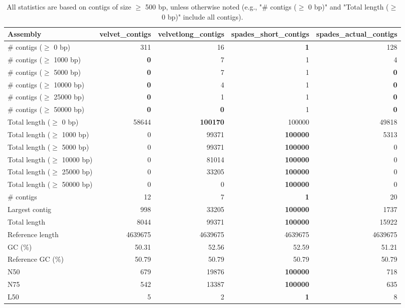 \documentclass[12pt,a4paper]{article}
\begin{document}
\begin{table}[ht]
\begin{center}
\caption{All statistics are based on contigs of size $\geq$ 500 bp, unless otherwise noted (e.g., "\# contigs ($\geq$ 0 bp)" and "Total length ($\geq$ 0 bp)" include all contigs).}
\begin{tabular}{|l*{4}{|r}|}
\hline
Assembly & velvet\_contigs & velvetlong\_contigs & spades\_short\_contigs & spades\_actual\_contigs \\ \hline
\# contigs ($\geq$ 0 bp) & 311 & 16 & {\bf 1} & 128 \\ \hline
\# contigs ($\geq$ 1000 bp) & {\bf 0} & 7 & 1 & 4 \\ \hline
\# contigs ($\geq$ 5000 bp) & {\bf 0} & 7 & 1 & {\bf 0} \\ \hline
\# contigs ($\geq$ 10000 bp) & {\bf 0} & 4 & 1 & {\bf 0} \\ \hline
\# contigs ($\geq$ 25000 bp) & {\bf 0} & 1 & 1 & {\bf 0} \\ \hline
\# contigs ($\geq$ 50000 bp) & {\bf 0} & {\bf 0} & 1 & {\bf 0} \\ \hline
Total length ($\geq$ 0 bp) & 58644 & {\bf 100170} & 100000 & 49818 \\ \hline
Total length ($\geq$ 1000 bp) & 0 & 99371 & {\bf 100000} & 5313 \\ \hline
Total length ($\geq$ 5000 bp) & 0 & 99371 & {\bf 100000} & 0 \\ \hline
Total length ($\geq$ 10000 bp) & 0 & 81014 & {\bf 100000} & 0 \\ \hline
Total length ($\geq$ 25000 bp) & 0 & 33205 & {\bf 100000} & 0 \\ \hline
Total length ($\geq$ 50000 bp) & 0 & 0 & {\bf 100000} & 0 \\ \hline
\# contigs & 12 & 7 & {\bf 1} & 20 \\ \hline
Largest contig & 998 & 33205 & {\bf 100000} & 1737 \\ \hline
Total length & 8044 & 99371 & {\bf 100000} & 15922 \\ \hline
Reference length & 4639675 & 4639675 & 4639675 & 4639675 \\ \hline
GC (\%) & 50.31 & 52.56 & 52.59 & 51.21 \\ \hline
Reference GC (\%) & 50.79 & 50.79 & 50.79 & 50.79 \\ \hline
N50 & 679 & 19876 & {\bf 100000} & 718 \\ \hline
N75 & 542 & 13387 & {\bf 100000} & 635 \\ \hline
L50 & 5 & 2 & {\bf 1} & 8 \\ \hline

\end{tabular}
\end{center}
\end{table}
\end{document}

